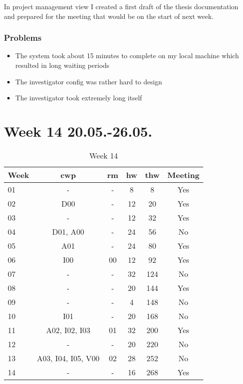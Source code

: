 In project management view I created a first draft of the thesis documentation and prepared for the meeting that would be on the start of next week.

\subsubsection{Problems}

\begin{itemize}
    \item The system took about 15 minutes to complete on my local machine which resulted in long waiting periods
    \item The investigator config was rather hard to design
    \item The investigator took extremely long itself
\end{itemize}

\section{Week 14 20.05.-26.05.}
\label{sec:journal:week14}

\begin{table}[!ht]
    \begin{center}
        \caption{Week 14}
        \label{tab:journal:week14}
        \begin{tabular}{l|c|c|c|c|c}
            \textbf{Week} & \textbf{\gls{cwp}} & \textbf{\gls{rm}} & \textbf{\gls{hw}} & \textbf{\gls{thw}} & \textbf{Meeting}\\
        \hline
        01 & - & - & 8 & 8 & Yes \\
        02 & D00 & - & 12 & 20 & Yes \\
        03 & - & - & 12 & 32 & Yes \\
        04 & D01, A00 & - & 24 & 56 & No \\
        05 & A01 & - & 24 & 80 & Yes \\
        06 & I00 & 00 & 12 & 92 & Yes \\
        07 & - & - & 32 & 124 & No \\
        08 & - & - & 20 & 144 & Yes \\
        09 & - & - & 4 & 148 & No \\
        10 & I01 & - & 20 & 168 & No \\
        11 & A02, I02, I03 & 01 & 32 & 200 & Yes \\
        12 & - & - & 20 & 220 & No \\
        13 & A03, I04, I05, V00 & 02 & 28 & 252 & No \\
        14 & - & - & 16 & 268 & Yes \\
        \end{tabular}
    \end{center}
\end{table}

